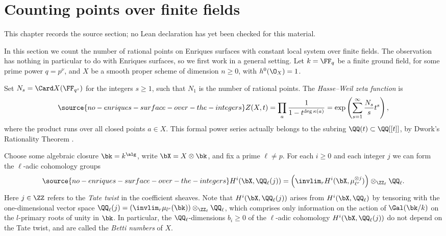 \chapter{Counting points over finite fields}
\label{no-enriques-surface-over-the-integers-chapter-08}

\begin{remark}
\label{no-enriques-surface-over-the-integers-chapter-08-source}
This chapter records the source section; no Lean declaration has yet been checked for this material.
\notready
\end{remark}

\label{Counting points}

In this section we count the number of rational points  on Enriques surfaces  with constant local system over finite fields.
The observation has nothing in particular to do with Enriques surfaces, so we first work in a general setting.
Let $k=\FF_q$ be a finite ground field, for some prime power $q=p^\nu$, and   $X$ be a smooth proper scheme of dimension $n\geq 0$,
with $h^0(\O_X)=1$.

Set $N_s=\Card X(\FF_{q^s})$ for  the integers $s\geq 1$, such that $N_1$ is the number of rational points.
The \emph{Hasse--Weil zeta function} is
\begin{equation}
\label{zeta function}
\source{no-enriques-surface-over-the-integers}
Z(X,t) = \prod_a \frac{1}{1-t^{\deg\kappa(a)}} =\exp\left(\sum_{s=1}^\infty \frac{N_s }{s}t^s\right),
\end{equation}
where the product runs over all closed points $a\in X$. This formal power series actually belongs to
the subring $\QQ(t)\subset\QQ[[t]]$, by Dwork's Rationality Theorem \cite{Dwork-1960}.

Choose some algebraic closure $\bk=k^\alg$, write $\bX=X\otimes \bk$, and fix a prime $\ell\neq p$.
For each $i\geq 0$ and each integer $j$ we can form the  $\ell$-adic cohomology groups
\begin{equation}
\label{l-adic cohomology groups}
\source{no-enriques-surface-over-the-integers}
H^i(\bX,\QQ_\ell(j))= \left( \invlim_r H^i(\bX,\mu^{\otimes j}_{\ell^r})\right)\otimes_{\ZZ_\ell}\QQ_\ell.
\end{equation}
Here $j\in\ZZ$ refers to the \emph{Tate twist} in the coefficient sheaves. Note that $H^i(\bX,\QQ_\ell(j))$
arises from $H^i(\bX,\QQ_\ell)$ by tensoring with the one-dimensional  vector space
$\QQ_\ell(j)=(\invlim_r\mu_{l^r}(\bk))\otimes_{\ZZ_\ell}\QQ_\ell$, which comprises only information on the action of $\Gal(\bk/k)$
on the $l$-primary roots of unity in $\bk$.
In particular, the $\QQ_\ell$-dimensions $b_i\geq 0$ of the $\ell$-adic cohomology
$H^i(\bX,\QQ_\ell(j))$ do not depend on the Tate twist, and are called  the \emph{Betti numbers} of $X$.

